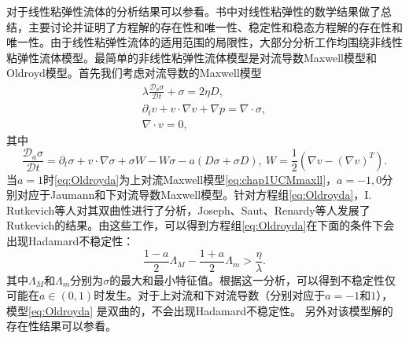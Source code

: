对于线性粘弹性流体的分析结果可以参看\cite{fabrizio1992mathematical,renardy2000mathematical}。书中对线性粘弹性的数学结果做了总结，主要讨论并证明了方程解的存在性和唯一性、稳定性和稳态方程解的存在性和唯一性。由于线性粘弹性流体的适用范围的局限性，大部分分析工作均围绕非线性粘弹性流体模型。最简单的非线性粘弹性流体模型是对流导数Maxwell模型和Oldroyd模型。首先我们考虑对流导数的Maxwell模型
\begin{subequations}\label{eq:Oldroyda}
\begin{align}
	\lambda \frac{\mathcal{D}_a \sigma}{\mathcal{D} t} + \sigma = 2 \eta D, \\
	\partial_t v + v \cdot \nabla v  + \nabla p = \nabla \cdot \sigma, \\
	\nabla \cdot v = 0,
\end{align}
\end{subequations}
其中
\begin{equation*}%
	\frac{\mathcal{D}_a \sigma}{\mathcal{D} t} = \partial_t \sigma + v \cdot \nabla \sigma + \sigma W- W \sigma - a(D \sigma + \sigma D), \ W = \frac{1}{2}(\nabla v - (\nabla v)^T).
\end{equation*}
当$a=1$时\eqref{eq:Oldroyda}为上对流Maxwell模型\eqref{eq:chap1UCMmaxll}，$a=-1,0$分别对应于Jaumann和下对流导数Maxwell模型。针对方程组\eqref{eq:Oldroyda}，I. Rutkevich等人对其双曲性进行了分析\cite{rutkevich1969some,rutkevich1970propagation}，Joseph、Saut、Renardy等人发展了Rutkevich的结果\cite{joseph1987hyperbolicity,joseph1986change}。由这些工作，可以得到方程组\eqref{eq:Oldroyda}在下面的条件下会出现Hadamard不稳定性：
\begin{equation*}
	\frac{1-a}{2} \Lambda_M - \frac{1+a}{2} \Lambda_m > \frac{\eta}{\lambda}.
\end{equation*}
其中$\Lambda_M$和$\Lambda_m$分别为$\sigma$的最大和最小特征值。根据这一分析，可以得到不稳定性仅可能在$a\in (0,1)$时发生。对于上对流和下对流导数（分别对应于$a=-1$和$1$），模型\eqref{eq:Oldroyda}
是双曲的，不会出现Hadamard不稳定性。
另外对该模型解的存在性结果可以参看\cite{saut2012lectures}。

